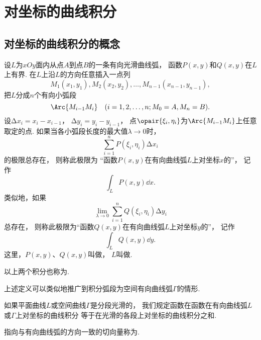 \section{对坐标的曲线积分}
\subsection{对坐标的曲线积分的概念}
\begin{definition}
设\(L\)为\(xOy\)面内从点\(A\)到点\(B\)的一条有向光滑曲线弧，
函数\(P(x,y)\)和\(Q(x,y)\)在\(L\)上有界.
在\(L\)上沿\(L\)的方向任意插入一点列\begin{equation*}
	M_1(x_1,y_1),
	M_2(x_2,y_2),
	\dotsc,
	M_{n-1}(x_{n-1},y_{n-1}),
\end{equation*}
把\(L\)分成\(n\)个有向小弧段\begin{equation*}
	\Arc{M_{i-1} M_i} \quad (i=1,2,\dotsc,n; M_0 = A, M_n = B).
\end{equation*}
设\(\increment x_i = x_i - x_{i-1}\)，
\(\increment y_i = y_i - y_{i-1}\)，
点\(\opair{\xi_i,\eta_i}\)为\(\Arc{M_{i-1} M_i}\)上任意取定的点.
如果当各小弧段长度的最大值\(\lambda\to0\)时，\begin{equation*}
	\sum_{i=1}^n P(\xi_i,\eta_i) \increment x_i
\end{equation*}的极限总存在，
则称此极限为
“函数\(P(x,y)\)在有向曲线弧\(L\)上对坐标\(x\)的”，
记作\begin{equation*}
	\int_L P(x,y) \dd{x}.
\end{equation*}
类似地，如果\begin{equation*}
	\lim_{\lambda\to0} \sum_{i=1}^n Q(\xi_i,\eta_i) \increment y_i
\end{equation*}总存在，
则称此极限为“函数\(Q(x,y)\)在有向曲线弧\(L\)上对坐标\(y\)的”，
记作\begin{equation*}
	\int_L Q(x,y) \dd{y}.
\end{equation*}
这里，\(P(x,y)\)、\(Q(x,y)\)叫做，
\(L\)叫做.
\end{definition}
以上两个积分也称为.

上述定义可以类似地推广到积分弧段为空间有向曲线弧\(\Gamma\)的情形.

如果平面曲线\(L\)或空间曲线\(\Gamma\)是分段光滑的，
我们规定函数在函数在有向曲线弧\(L\)或\(\Gamma\)上对坐标的曲线积分
等于在光滑的各段上对坐标的曲线积分之和.

指向与有向曲线弧的方向一致的切向量称为.

